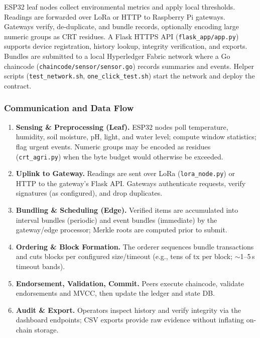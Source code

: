 \documentclass[12pt,onecolumn]{IEEEtran} %
\begin{document}
ESP32 leaf nodes collect environmental metrics and apply local thresholds. Readings are forwarded over LoRa or HTTP to Raspberry Pi gateways. Gateways verify, de-duplicate, and bundle records, optionally encoding large numeric groups as CRT residues. A Flask HTTPS API (\texttt{flask\_app/app.py}) supports device registration, history lookup, integrity verification, and exports. Bundles are submitted to a local Hyperledger Fabric network where a Go chaincode (\texttt{chaincode/sensor/sensor.go}) records summaries and events. Helper scripts (\texttt{test\_network.sh}, \texttt{one\_click\_test.sh}) start the network and deploy the contract.

\subsubsection{Communication and Data Flow}
\label{subsubsec:communication-data-flow}

\begin{enumerate}
    \item \textbf{Sensing \& Preprocessing (Leaf).} ESP32 nodes poll temperature, humidity, soil moisture, pH, light, and water level; compute window statistics; flag urgent events. Numeric groups may be encoded as residues (\texttt{crt\_agri.py}) when the byte budget would otherwise be exceeded.
    \item \textbf{Uplink to Gateway.} Readings are sent over LoRa (\texttt{lora\_node.py}) or HTTP to the gateway’s Flask API. Gateways authenticate requests, verify signatures (as configured), and drop duplicates.
    \item \textbf{Bundling \& Scheduling (Edge).} Verified items are accumulated into interval bundles (periodic) and event bundles (immediate) by the gateway/edge processor; Merkle roots are computed prior to submit.
    \item \textbf{Ordering \& Block Formation.} The orderer sequences bundle transactions and cuts blocks per configured size/timeout (e.g., tens of tx per block; $\sim$1--5\,s timeout bands).
    \item \textbf{Endorsement, Validation, Commit.} Peers execute chaincode, validate endorsements and MVCC, then update the ledger and state DB.
    \item \textbf{Audit \& Export.} Operators inspect history and verify integrity via the dashboard endpoints; CSV exports provide raw evidence without inflating on-chain storage.
\end{enumerate}
\end{document}
